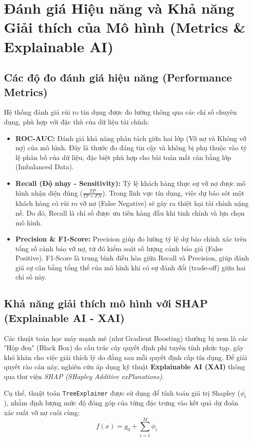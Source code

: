 \section{Đánh giá Hiệu năng và Khả năng Giải thích của Mô hình (Metrics \& Explainable AI)}

\subsection{Các độ đo đánh giá hiệu năng (Performance Metrics)}
Hệ thống đánh giá rủi ro tín dụng được đo lường thông qua các chỉ số chuyên dụng, phù hợp với đặc thù của dữ liệu tài chính:
\begin{itemize}
    \item \textbf{ROC-AUC:} Đánh giá khả năng phân tách giữa hai lớp (Vỡ nợ và Không vỡ nợ) của mô hình. Đây là thước đo đáng tin cậy và không bị phụ thuộc vào tỷ lệ phân bố của dữ liệu, đặc biệt phù hợp cho bài toán mất cân bằng lớp (Imbalanced Data).
    \item \textbf{Recall (Độ nhạy - Sensitivity):} Tỷ lệ khách hàng thực sự vỡ nợ được mô hình nhận diện đúng ($\frac{TP}{TP + FN}$). Trong lĩnh vực tín dụng, việc dự báo sót một khách hàng có rủi ro vỡ nợ (False Negative) sẽ gây ra thiệt hại tài chính nặng nề. Do đó, Recall là chỉ số được ưu tiên hàng đầu khi tinh chỉnh và lựa chọn mô hình.
    \item \textbf{Precision \& F1-Score:} Precision giúp đo lường tỷ lệ dự báo chính xác trên tổng số cảnh báo vỡ nợ, từ đó kiểm soát số lượng cảnh báo giả (False Positive). F1-Score là trung bình điều hòa giữa Recall và Precision, giúp đánh giá sự cân bằng tổng thể của mô hình khi có sự đánh đổi (trade-off) giữa hai chỉ số này.
\end{itemize}

\subsection{Khả năng giải thích mô hình với SHAP (Explainable AI - XAI)}
Các thuật toán học máy mạnh mẽ (như Gradient Boosting) thường bị xem là các "Hộp đen" (Black Box) do cấu trúc cây quyết định phi tuyến tính phức tạp, gây khó khăn cho việc giải thích lý do đằng sau mỗi quyết định cấp tín dụng. Để giải quyết rào cản này, nghiên cứu áp dụng kỹ thuật \textbf{Explainable AI (XAI)} thông qua thư viện \textit{SHAP (SHapley Additive exPlanations)}. 

Cụ thể, thuật toán \texttt{TreeExplainer} được sử dụng để tính toán giá trị Shapley ($\phi_i$), nhằm định lượng mức độ đóng góp của từng đặc trưng vào kết quả dự đoán xác suất vỡ nợ cuối cùng:
\begin{equation}
    f(x) = g_0 + \sum_{i=1}^{M} \phi_i
\end{equation}

